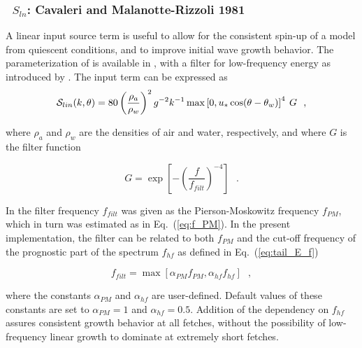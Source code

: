 \vsssub
\subsubsection{~$S_{ln}$: Cavaleri and Malanotte-Rizzoli 1981} \label{sec:LN1}
\vsssub


\noindent 
A linear input source term is useful to allow for the consistent spin-up of a
model from quiescent conditions, and to improve initial wave growth
behavior. The parameterization of \cite{art:CMR81} is available in \ws, with a
filter for low-frequency energy as introduced by \cite{tol:JPO92}. The input
term can be expressed as
\begin{equation}
\cS_{lin}(k,\theta) = 80 \left( \frac{\rho_a}{\rho_w} \right ) ^2
  g^{-2}  k^{-1} \max \left [ 0 , u_* \cos (\theta - \theta_w) \right ]^4 \: G
   \:\:\: , \label{eq:CMR81}
\end{equation}

\noindent
where $\rho_a$ and $\rho_w$ are the densities of air and water, respectively,
and where $G$ is the filter function

\begin{equation}
G = \exp \left [ - \left ( \frac{f}{f_{filt}} \right ) ^{-4} \right ]
\:\:\: . \label{eq:GSln}
\end{equation}

\noindent
In \cite {tol:JPO92} the filter frequency $f_{filt}$ was given as the
Pierson-Moskowitz frequency $f_{PM}$, which in turn was estimated as in
Eq.~(\ref{eq:f_PM}).  In the present implementation, the filter can be related
to both $f_{PM}$ and the cut-off frequency of the prognostic part of the
spectrum $f_{hf}$ as defined in Eq.~(\ref{eq:tail_E_f})

\begin{equation}
f_{filt} = \max \left [ \alpha_{PM} f_{PM} , \alpha_{hf} f_{hf} \right ]
\:\:\: ,
\end{equation}

\noindent
where the constants $\alpha_{PM}$ and $\alpha_{hf}$ are user-defined. Default
values of these constants are set to $\alpha_{PM} = 1$ and $\alpha_{hf} =
0.5$.  Addition of the dependency on $f_{hf}$ assures consistent growth
behavior at all fetches, without the possibility of low-frequency linear
growth to dominate at extremely short fetches.

